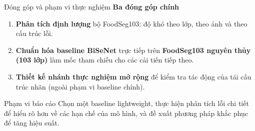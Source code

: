 \begin{frame}{Đóng góp và phạm vi thực nghiệm}
    \textbf{Ba đóng góp chính}
      \begin{enumerate}
        \item \textbf{Phân tích định lượng} bộ FoodSeg103: độ khó theo lớp, theo ảnh và theo cấu trúc lỗi.
        \item \textbf{Chuẩn hóa baseline BiSeNet} trực tiếp trên \textbf{FoodSeg103 nguyên thủy (103 lớp)} làm mốc tham chiếu cho các cải tiến tiếp theo.
        \item \textbf{Thiết kế nhánh thực nghiệm mở rộng} để kiểm tra tác động của tái cấu trúc nhãn (ngoài phạm vi baseline chính).
      \end{enumerate}
\vspace{0.25em}
      \begin{alertblock}{Phạm vi báo cáo}
            Chọn một baseline lightweight, thực hiện phân tích lỗi chi tiết để hiểu rõ hơn về các hạn chế của mô hình, và đề xuất phương pháp khắc phục để tăng hiệu suất.

      \end{alertblock}
\end{frame}
